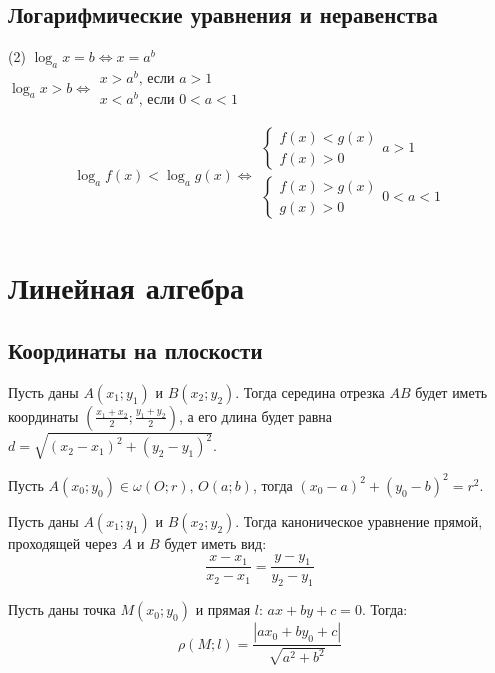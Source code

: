 \documentclass[12pt]{article}
\begin{document}
    \subsection{Логарифмические уравнения и неравенства}

    \begin{tasks}(2)
        \task[] $\log_ax=b\Longleftrightarrow x=a^b$\\
        \task[] $\log_ax>b\Longleftrightarrow \begin{array}{l}
            x>a^b\text{, если }a>1\\
            x<a^b\text{, если }0<a<1
        \end{array}$\\
    \end{tasks}
    $$\log_af(x)<\log_ag(x)\Longleftrightarrow
        \begin{array}{l}
            \begin{cases}
                f(x) < g(x)\\
                f(x) > 0
            \end{cases}a>1\\
            \begin{cases}
                f(x) > g(x)\\
                g(x) > 0
            \end{cases}0<a<1\\
        \end{array}$$

\section{Линейная алгебра}

\subsection{Координаты на плоскости}

\begin{statement}
    Пусть даны $A(x_1;y_1)$ и $B(x_2;y_2)$. Тогда середина отрезка $AB$ будет иметь координаты $(\frac{x_1+x_2}{2};\frac{y_1+y_2}{2})$, а его длина будет равна $d=\sqrt{(x_2-x_1)^2+(y_2-y_1)^2}$.
\end{statement}
\begin{statement}
    Пусть $A(x_0;y_0)\in\omega(O;r),\,O(a;b)$, тогда $(x_0-a)^2+(y_0-b)^2=r^2$.
\end{statement}
\begin{statement}
    Пусть даны $A(x_1;y_1)$ и $B(x_2;y_2)$. Тогда каноническое уравнение прямой, проходящей через $A$ и $B$ будет иметь вид:
    $$\frac{x-x_1}{x_2-x_1}=\frac{y-y_1}{y_2-y_1}$$
\end{statement}
\begin{statement}
    Пусть даны точка $M(x_0;y_0)$ и прямая $l:\, ax+by+c=0$. Тогда:
    $$\rho(M;l)=\frac{|ax_0+by_0+c|}{\sqrt{a^2+b^2}}$$
\end{statement}
\end{document}
